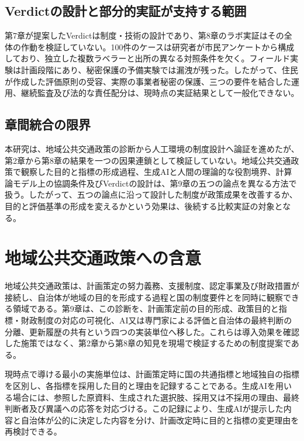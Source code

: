 \subsection{Verdictの設計と部分的実証が支持する範囲}

第7章が提案したVerdictは制度・技術の設計であり、第8章のラボ実証はその全体の作動を検証していない。100件のケースは研究者が市民アンケートから構成しており、独立した複数ラベラーと出所の異なる対照条件を欠く。フィールド実験は計画段階にあり、秘密保護の予備実験では漏洩が残った。したがって、住民が作成した評価原則の受容、実際の事業者秘密の保護、三つの要件を結合した運用、継続監査及び法的な責任配分は、現時点の実証結果として一般化できない。

\subsection{章間統合の限界}

本研究は、地域公共交通政策の診断から人工環境の制度設計へ論証を進めたが、第2章から第8章の結果を一つの因果連鎖として検証していない。地域公共交通政策で観察した目的と指標の形成過程、生成AIと人間の理論的な役割境界、計算論モデル上の協調条件及びVerdictの設計は、第9章の五つの論点を異なる方法で扱う。したがって、五つの論点に沿って設計した制度が政策成果を改善するか、目的と評価基準の形成を変えるかという効果は、後続する比較実証の対象となる。

\section{地域公共交通政策への含意}
\label{sec:ch10_transport_implications}

地域公共交通政策は、計画策定の努力義務、支援制度、認定事業及び財政措置が接続し、自治体が地域の目的を形成する過程と国の制度要件とを同時に観察できる領域である。第9章は、この診断を、計画策定前の目的形成、政策目的と指標・財政制度の対応の可視化、AI又は専門家による評価と自治体の最終判断の分離、更新履歴の共有という四つの実装単位へ移した。これらは導入効果を確認した施策ではなく、第2章から第8章の知見を現場で検証するための制度提案である。

現時点で導ける最小の実施単位は、計画策定時に国の共通指標と地域独自の指標を区別し、各指標を採用した目的と理由を記録することである。生成AIを用いる場合には、参照した原資料、生成された選択肢、採用又は不採用の理由、最終判断者及び異議への応答を対応づける。この記録により、生成AIが提示した内容と自治体が公的に決定した内容を分け、計画改定時に目的と指標の変更理由を再検討できる。

